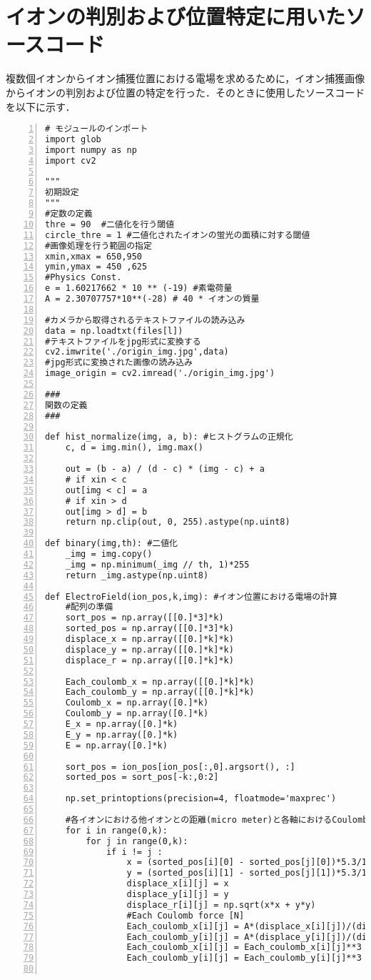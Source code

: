 \documentclass[a4paper,11pt,titlepage,openany]{jsbook}
\begin{document}
\chapter{イオンの判別および位置特定に用いたソースコード}\label{source_code}
複数個イオンからイオン捕獲位置における電場を求めるために，イオン捕獲画像からイオンの判別および位置の特定を行った．そのときに使用したソースコードを以下に示す．
\begin{Verbatim}[numbers = left,frame=single]
# モジュールのインポート
import glob
import numpy as np
import cv2

"""
初期設定
"""
#定数の定義
thre = 90  #二値化を行う閾値
circle_thre = 1 #二値化されたイオンの蛍光の面積に対する閾値
#画像処理を行う範囲の指定
xmin,xmax = 650,950
ymin,ymax = 450 ,625
#Physics Const.
e = 1.60217662 * 10 ** (-19) #素電荷量
A = 2.30707757*10**(-28) # 40 * イオンの質量

#カメラから取得されるテキストファイルの読み込み
data = np.loadtxt(files[l])
#テキストファイルをjpg形式に変換する
cv2.imwrite('./origin_img.jpg',data)
#jpg形式に変換された画像の読み込み
image_origin = cv2.imread('./origin_img.jpg')

###
関数の定義
###

def hist_normalize(img, a, b): #ヒストグラムの正規化
    c, d = img.min(), img.max()
    
    out = (b - a) / (d - c) * (img - c) + a
    # if xin < c
    out[img < c] = a
    # if xin > d
    out[img > d] = b
    return np.clip(out, 0, 255).astype(np.uint8)

def binary(img,th): #二値化
    _img = img.copy()
    _img = np.minimum(_img // th, 1)*255
    return _img.astype(np.uint8)

def ElectroField(ion_pos,k,img): #イオン位置における電場の計算
    #配列の準備 
    sort_pos = np.array([[0.]*3]*k)
    sorted_pos = np.array([[0.]*3]*k)
    displace_x = np.array([[0.]*k]*k)
    displace_y = np.array([[0.]*k]*k)
    displace_r = np.array([[0.]*k]*k)
    
    Each_coulomb_x = np.array([[0.]*k]*k)
    Each_coulomb_y = np.array([[0.]*k]*k)
    Coulomb_x = np.array([0.]*k)
    Coulomb_y = np.array([0.]*k)
    E_x = np.array([0.]*k)
    E_y = np.array([0.]*k)
    E = np.array([0.]*k)
    
    sort_pos = ion_pos[ion_pos[:,0].argsort(), :]
    sorted_pos = sort_pos[-k:,0:2]

    np.set_printoptions(precision=4, floatmode='maxprec')

    #各イオンにおける他イオンとの距離(micro meter)と各軸におけるCoulomb力
    for i in range(0,k):
        for j in range(0,k):
            if i != j :         
                x = (sorted_pos[i][0] - sorted_pos[j][0])*5.3/12.9
                y = (sorted_pos[i][1] - sorted_pos[j][1])*5.3/12.9
                displace_x[i][j] = x
                displace_y[i][j] = y
                displace_r[i][j] = np.sqrt(x*x + y*y)
                #Each Coulomb force [N]
                Each_coulomb_x[i][j] = A*(displace_x[i][j])/(displace_r[i][j])
                Each_coulomb_y[i][j] = A*(displace_y[i][j])/(displace_r[i][j])
                Each_coulomb_x[i][j] = Each_coulomb_x[i][j]**3 * 10 **(12)
                Each_coulomb_y[i][j] = Each_coulomb_y[i][j]**3 * 10 **(12)
    

\end{Verbatim}
\end{document}
